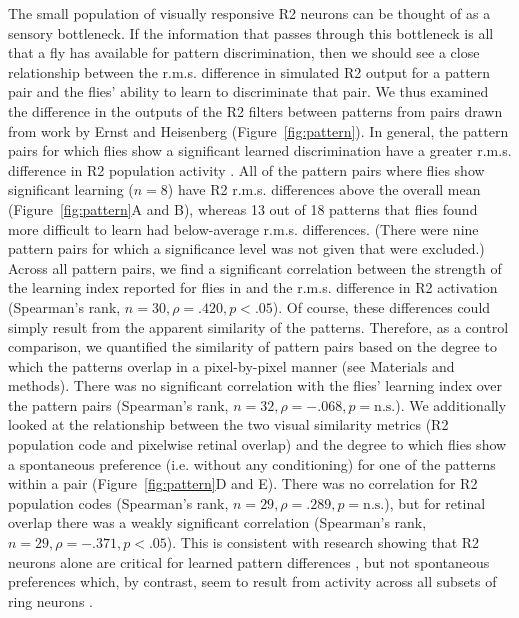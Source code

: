 The small population of visually responsive R2 neurons can be thought of as a sensory bottleneck. If the information that passes through this bottleneck is all that a fly has available for pattern discrimination, then we should see a close relationship between the r.m.s. difference in simulated R2 output for a pattern pair and the flies’ ability to learn to discriminate that pair. We thus examined the difference in the outputs of the R2 filters between patterns from pairs drawn from work by Ernst and Heisenberg \cite{Ernst1999} (Figure~\ref{fig:pattern}). In general, the pattern pairs for which flies show a significant learned discrimination have a greater r.m.s. difference in R2 population activity \cite{Ernst1999}. All of the pattern pairs where flies show significant learning ($n = 8$) have R2 r.m.s. differences above the overall mean (Figure~\ref{fig:pattern}A and B), whereas 13 out of 18 patterns that flies found more difficult to learn had below-average r.m.s. differences. (There were nine pattern pairs for which a significance level was not given that were excluded.) Across all pattern pairs, we find a significant correlation between the strength of the learning index reported for flies in \cite{Ernst1999} and the r.m.s. difference in R2 activation (Spearman’s rank, $n = 30, \rho = .420, p < .05$). Of course, these differences could simply result from the apparent similarity of the patterns. Therefore, as a control comparison, we quantified the similarity of pattern pairs based on the degree to which the patterns overlap in a pixel-by-pixel manner (see Materials and methods). There was no significant correlation with the flies’ learning index over the pattern pairs (Spearman’s rank, $n = 32, \rho = -.068, p = \mathrm{n.s.}$). We additionally looked at the relationship between the two visual similarity metrics (R2 population code and pixelwise retinal overlap) and the degree to which flies show a spontaneous preference (i.e. without any conditioning) for one of the patterns within a pair (Figure~\ref{fig:pattern}D and E). There was no correlation for R2 population codes (Spearman's rank, $n = 29, \rho = .289, p = \mathrm{n.s.}$), but for retinal overlap there was a weakly significant correlation (Spearman's rank, $n = 29, \rho = -.371, p < .05$). This is consistent with research showing that R2 neurons alone are critical for learned pattern differences \cite{Ernst1999}, but not spontaneous preferences which, by contrast, seem to result from activity across all subsets of ring neurons \cite{Solanki2015}.

